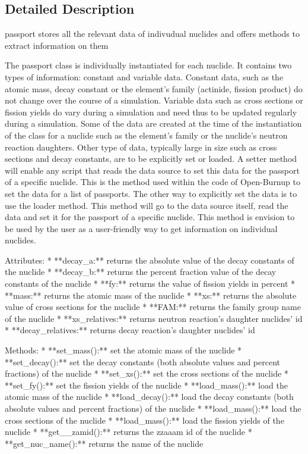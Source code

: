 \subsection{Detailed Description}
\begin{DoxyVerb}passport stores all the relevant data of indivudual nuclides and offers methods to extract information on them

   The passport class is individually instantiated for each nuclide. It contains two types of information: constant and variable data.
   Constant data, such as the atomic mass, decay constant or the element's family (actinide, fission product) do not change over the course of a simulation.
   Variable data such as cross sections or fission yields do vary during a simulation and need thus to be updated regularly during a simulation.
   Some of the data are created at the time of the instantiation of the class for a nuclide such as the element's family or the nuclide's
   neutron reaction daughters. Other type of data, typically large in size such as cross sections and decay constants, are to be explicitly set or loaded.
   A setter method will enable any script that reads the data source to set this data for the passport of a specific nuclide. This is the method used within
   the code of Open-Burnup to set the data for a list of passports. The other way to explicitly set the data is to use the loader method. This method will
   go to the data source itself, read the data and set it for the passport of a specific nuclide. This method is envision to be used by the user as a
   user-friendly way to get information on individual nuclides.

   Attributes:
       * **decay_a:** returns the absolute value of the decay constants of the nuclide
       * **decay_b:** returns the percent fraction value of the decay constants of the nuclide
       * **fy:** returns the value of fission yields in percent
       * **mass:** returns the atomic mass of the nuclide
       * **xs:** returns the absolute value of cross sections for the nuclide
       * **FAM:** returns the family group name of the nuclide
       * **xs_relatives:** returns neutron reaction's daughter nuclides' id
       * **decay_relatives:** returns decay reaction's daughter nuclides' id

   Methods:
       * **set_mass():** set the atomic mass of the nuclide
       * **set_decay():** set the decay constants (both absolute values and percent fractions) of the nuclide
       * **set_xs():** set the cross sections of the nuclide
       * **set_fy():** set the fission yields of the nuclide
       * **load_mass():** load the atomic mass of the nuclide
       * **load_decay():** load the decay constants (both absolute values and percent fractions) of the nuclide
       * **load_mass():** load the cross sections of the nuclide
       * **load_mass():** load the fission yields of the nuclide
       * **get__zamid():** returns the zzaaam id of the nuclide
       * **get_nuc_name():** returns the name of the nuclide\end{DoxyVerb}
 

